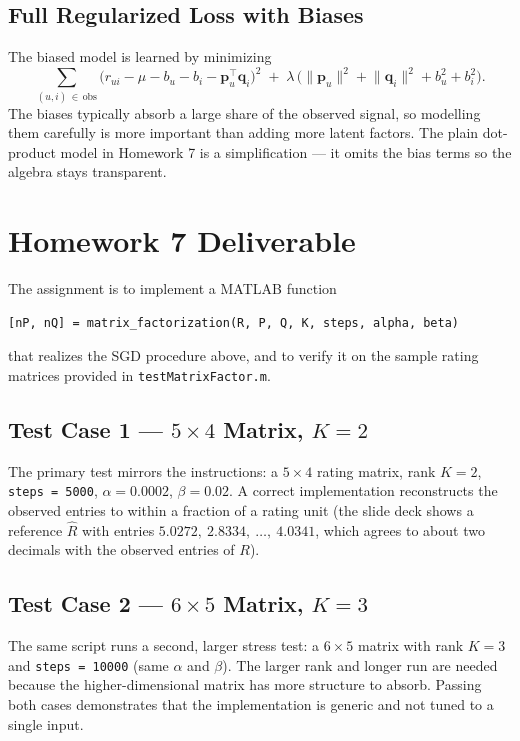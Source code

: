 \documentclass[11pt]{article}
\begin{document}
\subsection{Full Regularized Loss with Biases}
The biased model is learned by minimizing
\begin{equation}
    \sum_{(u,i)\,\in\,\text{obs}} \bigl( r_{ui} - \mu - b_u - b_i - \mathbf{p}_u^{\top}\mathbf{q}_i \bigr)^{2}
    \;+\; \lambda\,\bigl( \lVert \mathbf{p}_u \rVert^{2} + \lVert \mathbf{q}_i \rVert^{2} + b_u^{2} + b_i^{2} \bigr).
\end{equation}
The biases typically absorb a large share of the observed signal, so modelling them carefully is more important than adding more latent factors. The plain dot-product model in Homework 7 is a simplification --- it omits the bias terms so the algebra stays transparent.


\section{Homework 7 Deliverable}

The assignment is to implement a MATLAB function
\begin{verbatim}
[nP, nQ] = matrix_factorization(R, P, Q, K, steps, alpha, beta)
\end{verbatim}
that realizes the SGD procedure above, and to verify it on the sample rating matrices provided in \texttt{testMatrixFactor.m}.

\subsection{Test Case 1 --- $5 \times 4$ Matrix, $K=2$}
The primary test mirrors the instructions: a $5 \times 4$ rating matrix, rank $K = 2$, \texttt{steps = 5000}, $\alpha = 0.0002$, $\beta = 0.02$. A correct implementation reconstructs the observed entries to within a fraction of a rating unit (the slide deck shows a reference $\hat{R}$ with entries $5.0272,\ 2.8334,\ \ldots,\ 4.0341$, which agrees to about two decimals with the observed entries of $R$).

\subsection{Test Case 2 --- $6 \times 5$ Matrix, $K=3$}
The same script runs a second, larger stress test: a $6 \times 5$ matrix with rank $K = 3$ and \texttt{steps = 10000} (same $\alpha$ and $\beta$). The larger rank and longer run are needed because the higher-dimensional matrix has more structure to absorb. Passing both cases demonstrates that the implementation is generic and not tuned to a single input.
\end{document}

